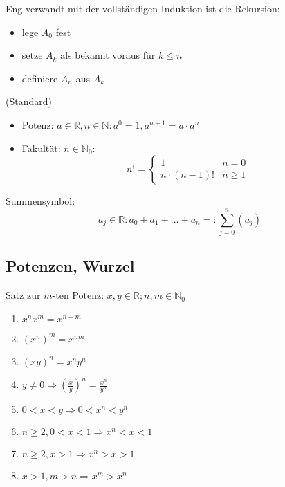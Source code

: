 Eng verwandt mit der vollständigen Induktion ist die Rekursion:
\begin{itemize}
 \item lege $A_0$ fest
 \item setze $A_k$ als bekannt voraus für $k \leq n$
 \item definiere $A_n$ aus $A_k$
\end{itemize}

\begin{example} (Standard)
  \begin{itemize}
    \item Potenz: $a \in \mathbb{R}, n \in \mathbb{N}: a^0 = 1, a^{n+1} = a\cdot a^n$
    \item Fakultät: $n \in \mathbb{N}_0:$
    \[ n! = \begin{cases} 1 & n = 0 \\ n \cdot (n-1)! & n \geq 1 \end{cases} \]
  \end{itemize}
\end{example}

\begin{definition} Summensymbol:
  \[ a_j \in \mathbb{R}: a_0 + a_1 + \ldots + a_n =: \sum_{j=0}^{n} \left( a_j \right) \]
\end{definition}

\subsection{Potenzen, Wurzel}

\begin{theorem} Satz zur $m$-ten Potenz:
  $x,y \in \mathbb{R}; n,m \in \mathbb{N}_0$
  \begin{enumerate}
   \item $x^nx^m = x^{n+m}$
   \item $(x^n)^m = x^{nm}$
   \item $(xy)^n = x^ny^n$
   \item $y \neq 0 \Rightarrow \left(\frac x y\right)^n = \frac{x^n}{y^n}$
   \item $0 < x < y \Rightarrow 0 < x^n < y^n$
   \item $n \geq 2, 0<x<1 \Rightarrow x^n<x<1$
   \item $n \geq 2, x > 1 \Rightarrow x^n>x>1$
   \item $x > 1, m > n \Rightarrow x^m > x^n$
  \end{enumerate}
  
  
\end{theorem}

